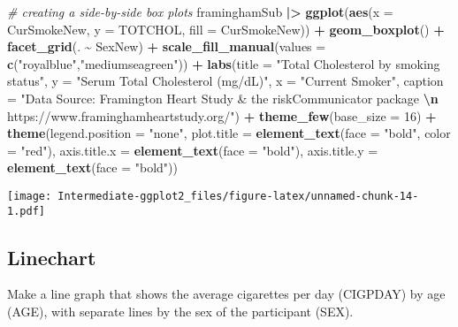 \documentclass[
]{article}
\newenvironment{Shaded}{\begin{snugshade}}{\end{snugshade}}
\newcommand{\AttributeTok}[1]{\textcolor[rgb]{0.13,0.29,0.53}{#1}}
\newcommand{\CommentTok}[1]{\textcolor[rgb]{0.56,0.35,0.01}{\textit{#1}}}
\newcommand{\DecValTok}[1]{\textcolor[rgb]{0.00,0.00,0.81}{#1}}
\newcommand{\FunctionTok}[1]{\textcolor[rgb]{0.13,0.29,0.53}{\textbf{#1}}}
\newcommand{\NormalTok}[1]{#1}
\newcommand{\SpecialCharTok}[1]{\textcolor[rgb]{0.81,0.36,0.00}{\textbf{#1}}}
\newcommand{\StringTok}[1]{\textcolor[rgb]{0.31,0.60,0.02}{#1}}
\begin{document}
\begin{Shaded}
\begin{Highlighting}[]
\CommentTok{\# creating a side{-}by{-}side box plots}
\NormalTok{framinghamSub }\SpecialCharTok{|\textgreater{}}
  \FunctionTok{ggplot}\NormalTok{(}\FunctionTok{aes}\NormalTok{(}\AttributeTok{x =}\NormalTok{ CurSmokeNew, }\AttributeTok{y =}\NormalTok{ TOTCHOL, }\AttributeTok{fill =}\NormalTok{ CurSmokeNew)) }\SpecialCharTok{+}
  \FunctionTok{geom\_boxplot}\NormalTok{() }\SpecialCharTok{+}
  \FunctionTok{facet\_grid}\NormalTok{(. }\SpecialCharTok{\textasciitilde{}}\NormalTok{ SexNew) }\SpecialCharTok{+}
  \FunctionTok{scale\_fill\_manual}\NormalTok{(}\AttributeTok{values =} \FunctionTok{c}\NormalTok{(}\StringTok{"royalblue"}\NormalTok{,}\StringTok{"mediumseagreen"}\NormalTok{)) }\SpecialCharTok{+}
  \FunctionTok{labs}\NormalTok{(}\AttributeTok{title =} \StringTok{"Total Cholesterol by smoking status"}\NormalTok{,}
       \AttributeTok{y =} \StringTok{"Serum Total Cholesterol (mg/dL)"}\NormalTok{,}
       \AttributeTok{x =} \StringTok{"Current Smoker"}\NormalTok{,}
       \AttributeTok{caption =} \StringTok{"Data Source: Framington Heart Study \& the riskCommunicator package }\SpecialCharTok{\textbackslash{}n}\StringTok{ https://www.framinghamheartstudy.org/"}\NormalTok{) }\SpecialCharTok{+}
  \FunctionTok{theme\_few}\NormalTok{(}\AttributeTok{base\_size =} \DecValTok{16}\NormalTok{) }\SpecialCharTok{+}
  \FunctionTok{theme}\NormalTok{(}\AttributeTok{legend.position =} \StringTok{"none"}\NormalTok{, }
        \AttributeTok{plot.title =} \FunctionTok{element\_text}\NormalTok{(}\AttributeTok{face =} \StringTok{"bold"}\NormalTok{, }\AttributeTok{color =} \StringTok{"red"}\NormalTok{),}
        \AttributeTok{axis.title.x =} \FunctionTok{element\_text}\NormalTok{(}\AttributeTok{face =} \StringTok{"bold"}\NormalTok{),}
        \AttributeTok{axis.title.y =} \FunctionTok{element\_text}\NormalTok{(}\AttributeTok{face =} \StringTok{"bold"}\NormalTok{))}
\end{Highlighting}
\end{Shaded}

\texttt{[image: Intermediate-ggplot2\_files/figure-latex/unnamed-chunk-14-1.pdf]}

\hypertarget{linechart}{%
\subsection{Linechart}\label{linechart}}

Make a line graph that shows the average cigarettes per day (CIGPDAY) by
age (AGE), with separate lines by the sex of the participant (SEX).
\end{document}
